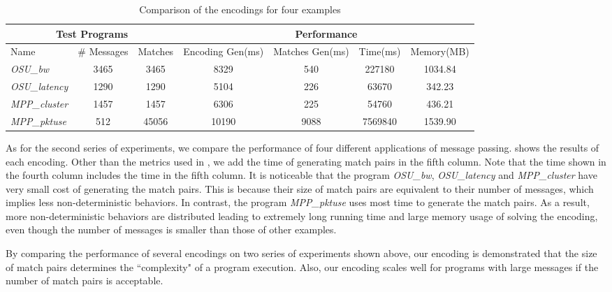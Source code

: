 \begin{table}
\begin{center}
\scriptsize
\begin{tabular}{|l|c|c||c|c|c|c|}
		\hline
         \multicolumn{3}{|c||}{Test Programs} & \multicolumn{4}{|c|}{Performance} \\ \hline
         Name & \# Messages & Matches & Encoding Gen(ms) & Matches Gen(ms) & Time(ms) & Memory(MB) \\ \hline
         \textit{OSU\_bw} & 3465 & 3465 & 8329 & 540 & 227180 & 1034.84 \\ 
         \textit{OSU\_latency} & 1290 & 1290 & 5104 & 226 & 63670 & 342.23 \\ 
         \textit{MPP\_cluster} & 1457 & 1457 & 6306 & 225 & 54760 & 436.21 \\
         \textit{MPP\_pktuse} & 512 & 45056 & 10190 & 9088 & 7569840 & 1539.90 \\ 
         \hline
		\end{tabular}
\end{center}
\caption{Comparison of the encodings for four examples}
\label{table:second}
\end{table}

As for the second series of experiments, we compare the performance of four different applications of message passing.  shows the results of each encoding. Other than the metrics used in , we add the time of generating match pairs in the fifth column. Note that the time shown in the fourth column includes the time in the fifth column. It is noticeable that the program \textit{OSU\_bw}, \textit{OSU\_latency} and \textit{MPP\_cluster} have very small cost of generating the match pairs. This is because their size of match pairs are equivalent to their number of messages, which implies less non-deterministic behaviors. In contrast, the program \textit{MPP\_pktuse} uses most time to generate the match pairs. As a result, more non-deterministic behaviors are distributed leading to extremely long running time and large memory usage of solving the encoding, even though the number of messages is smaller than those of other examples.

By comparing the performance of several encodings on two series of experiments shown above, our encoding is demonstrated that the size of match pairs determines the ``complexity" of a program execution. Also, our encoding scales well for programs with large messages if the number of match pairs is acceptable.

